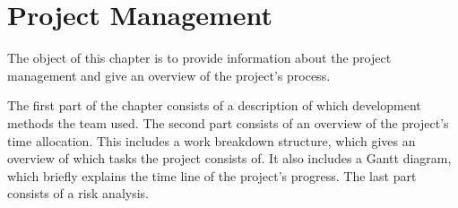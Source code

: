 \chapter{Project Management}

The object of this chapter is to provide information about the project management and give an overview of the project's process. 

The first part of the chapter consists of a description of which development methods the team used. The second part consists of an overview of the project's time allocation. This includes a work breakdown structure, which gives an overview of which tasks the project consists of. It also includes a Gantt diagram, which briefly explains the time line of the project's progress. The last part consists of a risk analysis.




\newpage


